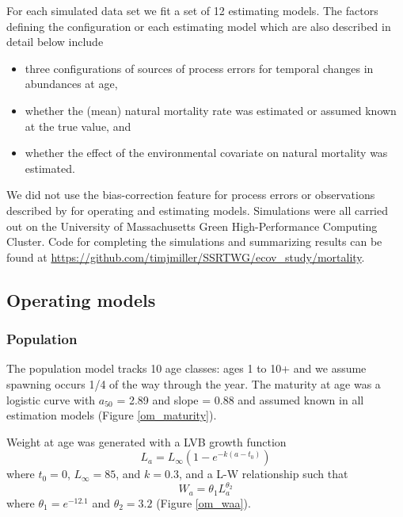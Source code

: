 \documentclass[
  12pt,
]{article}
\begin{document}
For each simulated data set we fit a set of 12 estimating models. The factors defining the configuration or each estimating model which are also described in detail below include

\begin{itemize}
\item three configurations of sources of process errors for temporal changes in abundances at age, 
\item whether the (mean) natural mortality rate was estimated or assumed known at the true value, and
\item whether the effect of the environmental covariate on natural mortality was estimated.
\end{itemize}

We did not use the bias-correction feature for process errors or observations described by \citep{stockmiller21} for operating and estimating models. Simulations were all carried out on the University of Massachusetts Green High-Performance Computing Cluster. Code for completing the simulations and summarizing results can be found at \url{https://github.com/timjmiller/SSRTWG/ecov_study/mortality}.

\hypertarget{operating-models}{%
\subsection*{Operating models}\label{operating-models}}

\hypertarget{population}{%
\subsubsection*{Population}\label{population}}

The population model tracks 10 age classes: ages 1 to 10+ and we assume spawning occurs 1/4 of the way through the year. The maturity at age was a logistic curve with \(a_{50}\) = 2.89 and slope = 0.88 and assumed known in all estimation models (Figure \ref{om_maturity}).

Weight at age was generated with a LVB growth function
\[
L_a = L_{\infty}\left(1 - e^{-k(a - t_0)}\right)
\]
where \(t_0 = 0\), \(L_\infty = 85\), and \(k = 0.3\), and a L-W relationship such that
\[
W_a = \theta_1 L_a^{\theta_2}
\]
where \(\theta_1 = e^{-12.1}\) and \(\theta_2 = 3.2\) (Figure \ref{om_waa}).
\end{document}
